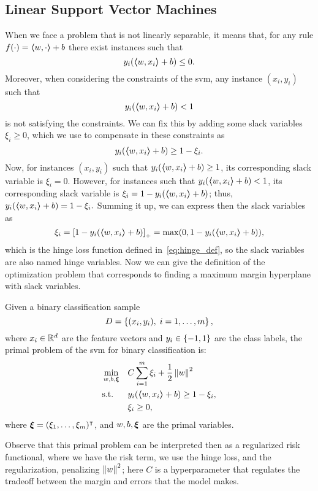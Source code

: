 \subsection{Linear Support Vector Machines}
%
When we face a problem that is not linearly separable, it means that, for any rule $f(\cdot) = \bm{\left\langle} w, \cdot \bm{\right\rangle} + b$ there exist instances such that 
$$ y_i (\bm{\left\langle} w, x_i \bm{\right\rangle} + b) \leq 0 .$$
Moreover, when considering the constraints of the \acrshort{svm}, any instance $(x_i, y_i)$ such that 
$$ y_i (\bm{\left\langle} w, x_i \bm{\right\rangle} + b) < 1 $$
is not satisfying the constraints.
%
We can fix this by adding some slack variables $\xi_i \geq 0$, which we use to compensate in these constraints as
$$ y_i (\bm{\left\langle} w, x_i \bm{\right\rangle} + b) \geq 1 - \xi_i. $$
Now, for instances $(x_i, y_i)$ such that $y_i (\bm{\left\langle} w, x_i \bm{\right\rangle} + b) \geq 1$, its corresponding slack variable is $\xi_i = 0$. However, for instances such that $y_i (\bm{\left\langle} w, x_i \bm{\right\rangle} + b) < 1$, its corresponding slack variable is $\xi_i = 1 - y_i (\bm{\left\langle} w, x_i \bm{\right\rangle} + b)$; thus, $y_i (\bm{\left\langle} w, x_i \bm{\right\rangle} + b) = 1 - \xi_i .$
Summing it up, we can express then the slack variables as 
\begin{equation}
    \nonumber
    \xi_i = \left[1 - y_i (\bm{\left\langle} w, x_i \bm{\right\rangle} + b)\right]_{+} = \max(0, 1 - y_i (\bm{\left\langle} w, x_i \bm{\right\rangle} + b)),
\end{equation} 
which is the hinge loss function defined in~\eqref{eq:hinge_def}, so the slack variables are also named hinge variables. 
Now we can give the definition of the optimization problem that corresponds to finding a maximum margin hyperplane with slack variables.
\begin{definition}
    Given a binary classification sample
    $$ D = \left\{(x_i, y_i), \; i=1, \ldots, m\right\} ,$$
    where $x_i \in \mathbb{R}^d$ are the feature vectors and $y_i \in \left\{-1, 1\right\}$ are the class labels, 
    the primal problem of the \acrshort{svm} for binary classification is:
    \begin{equation}
        \label{eq:linear_primal_clas}
        \begin{aligned}
            &\min_{w, b, \fv{\xi}} & & C \sum_{i=1}^m \xi_i + \frac{1}{2} \norm{w}^2 \\
            & \text{s.t.} & & y_i (\dotp{w}{x_i} + b) \geq 1 - \xi_i , \\
            & & & \xi_i \geq 0 ,      
        \end{aligned}  
    \end{equation}
    where $\bm{\xi} = (\xi_1, \ldots, \xi_m)^\intercal$, and $w, b, \bm{\xi}$ are the primal variables.
\end{definition}
Observe that this primal problem can be interpreted then as a regularized risk functional, where we have the risk term, we use the hinge loss, and the regularization, penalizing $\left\lVert w\right\rVert^2$; here $C$ is a hyperparameter that regulates the tradeoff between the margin and errors that the model makes.

